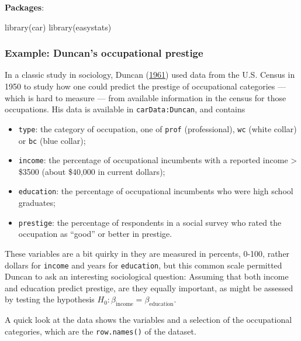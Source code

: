 \documentclass[
  letterpaper,
  10pt,
  krantz2]{krantz}
\makeatletter
\newenvironment{Shaded}{\begin{snugshade}}{\end{snugshade}}
\newcommand{\FunctionTok}[1]{\textcolor[rgb]{0.28,0.35,0.67}{#1}}
\newcommand{\NormalTok}[1]{\textcolor[rgb]{0.00,0.23,0.31}{#1}}
\providecommand{\tightlist}{%
  \setlength{\itemsep}{0pt}\setlength{\parskip}{0pt}}\usepackage{longtable,booktabs,array}
\newenvironment{kframe}{%
  \medskip{}
  \setlength{\fboxsep}{.8em}
  \def\at@end@of@kframe{}%
  \ifinner\ifhmode%
  \def\at@end@of@kframe{\end{minipage}}%
  \begin{minipage}{\columnwidth}%
  \fi\fi%
  \def\FrameCommand##1{\hskip\@totalleftmargin \hskip-\fboxsep
  \colorbox{shadecolor}{##1}\hskip-\fboxsep
      \hskip-\linewidth \hskip-\@totalleftmargin \hskip\columnwidth}%
  \MakeFramed {\advance\hsize-\width
    \@totalleftmargin\z@ \linewidth\hsize
    \@setminipage}}%
{\par\unskip\endMakeFramed%
  \at@end@of@kframe}
\renewenvironment{Shaded}{\begin{kframe}}{\end{kframe}}
\makeatother
\begin{document}
\textbf{Packages}:

\begin{Shaded}
\begin{Highlighting}[]
\FunctionTok{library}\NormalTok{(car)}
\FunctionTok{library}\NormalTok{(easystats)}
\end{Highlighting}
\end{Shaded}

\hypertarget{example-duncans-occupational-prestige}{%
\subsubsection*{Example: Duncan's occupational
prestige}\label{example-duncans-occupational-prestige}}

In a classic study in sociology, Duncan
(\protect\hyperlink{ref-Duncan:61}{1961}) used data from the U.S. Census
in 1950 to study how one could predict the prestige of occupational
categories --- which is hard to measure --- from available information
in the census for those occupations. His data is available in
\texttt{carData:Duncan}, and contains

\begin{itemize}
\tightlist
\item
  \texttt{type}: the category of occupation, one of \texttt{prof}
  (professional), \texttt{wc} (white collar) or \texttt{bc} (blue
  collar);
\item
  \texttt{income}: the percentage of occupational incumbents with a
  reported income \textgreater{} \$3500 (about \$40,000 in current
  dollars);
\item
  \texttt{education}: the percentage of occupational incumbents who were
  high school graduates;
\item
  \texttt{prestige}: the percentage of respondents in a social survey
  who rated the occupation as ``good'' or better in prestige.
\end{itemize}

These variables are a bit quirky in they are measured in percents,
0-100, rather dollars for \texttt{income} and years for
\texttt{education}, but this common scale permitted Duncan to ask an
interesting sociological question: Assuming that both income and
education predict prestige, are they equally important, as might be
assessed by testing the hypothesis
\(H_0: \beta_{\text{income}} = \beta_{\text{education}}\).

A quick look at the data shows the variables and a selection of the
occupational categories, which are the \texttt{row.names()} of the
dataset.
\end{document}

